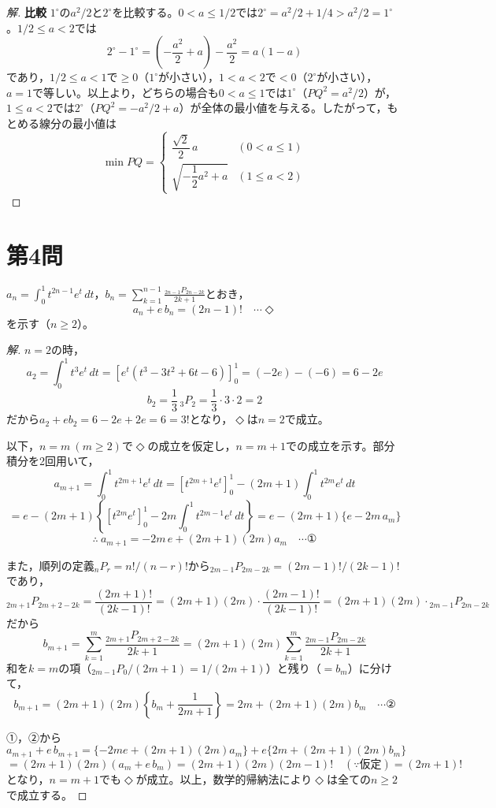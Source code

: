\documentclass[../main.tex]{subfiles}
\begin{document}
\begin{proof}[解]
  \textbf{比較} $1^\circ$の$a^2/2$と$2^\circ$を比較する。$0<a\le1/2$では$2^\circ=a^2/2+1/4>a^2/2=1^\circ$。$1/2\le a<2$では
  \[
    2^\circ-1^\circ=\left(-\frac{a^2}2+a\right)-\frac{a^2}2=a(1-a)
  \]
  であり，$1/2\le a<1$で$\ge0$（$1^\circ$が小さい），$1<a<2$で$<0$（$2^\circ$が小さい），$a=1$で等しい。以上より，どちらの場合も$0<a\le1$では$1^\circ$（$PQ^2=a^2/2$）が，$1\le a<2$では$2^\circ$（$PQ^2=-a^2/2+a$）が全体の最小値を与える。したがって，もとめる線分の最小値は
  \[
    \min PQ=
    \begin{cases}
      \dfrac{\sqrt2}2\,a & (0<a\le1)\\[2mm]
      \sqrt{-\dfrac12a^2+a} & (1\le a<2)
    \end{cases}
  \]
\end{proof}

\newpage

\section*{第4問}

$a_n=\displaystyle\int_0^1t^{2n-1}e^t\,dt$，$b_n=\displaystyle\sum_{k=1}^{n-1}\frac{{}_{2n-1}P_{2n-2k}}{2k+1}$とおき，
\[
  a_n+e\,b_n=(2n-1)! \quad\cdots\Diamond
\]
を示す（$n\ge2$）。

\begin{proof}[解]
  $n=2$の時，
  \[
    a_2=\int_0^1t^3e^t\,dt=\left[e^t(t^3-3t^2+6t-6)\right]_0^1=(-2e)-(-6)=6-2e
  \]
  \[
    b_2=\frac13\,{}_3P_2=\frac13\cdot3\cdot2=2
  \]
  だから$a_2+eb_2=6-2e+2e=6=3!$となり，$\Diamond$は$n=2$で成立。

  以下，$n=m\ (m\ge2)$で$\Diamond$の成立を仮定し，$n=m+1$での成立を示す。部分積分を2回用いて，
  \[
    a_{m+1}=\int_0^1t^{2m+1}e^t\,dt=\left[t^{2m+1}e^t\right]_0^1-(2m+1)\int_0^1t^{2m}e^t\,dt
  \]
  \[
    =e-(2m+1)\left\{\left[t^{2m}e^t\right]_0^1-2m\int_0^1t^{2m-1}e^t\,dt\right\}=e-(2m+1)\{e-2m\,a_m\}
  \]
  \[
    \therefore\ a_{m+1}=-2m\,e+(2m+1)(2m)a_m \quad\cdots\text{①}
  \]

  また，順列の定義${}_nP_r=n!/(n-r)!$から${}_{2m-1}P_{2m-2k}=(2m-1)!/(2k-1)!$であり，
  \[
    {}_{2m+1}P_{2m+2-2k}=\frac{(2m+1)!}{(2k-1)!}=(2m+1)(2m)\cdot\frac{(2m-1)!}{(2k-1)!}=(2m+1)(2m)\cdot{}_{2m-1}P_{2m-2k}
  \]
  だから
  \[
    b_{m+1}=\sum_{k=1}^m\frac{{}_{2m+1}P_{2m+2-2k}}{2k+1}=(2m+1)(2m)\sum_{k=1}^m\frac{{}_{2m-1}P_{2m-2k}}{2k+1}
  \]
  和を$k=m$の項（${}_{2m-1}P_0/(2m+1)=1/(2m+1)$）と残り（$=b_m$）に分けて，
  \[
    b_{m+1}=(2m+1)(2m)\left\{b_m+\frac1{2m+1}\right\}=2m+(2m+1)(2m)b_m \quad\cdots\text{②}
  \]

  ①，②から
  \[
    a_{m+1}+e\,b_{m+1}=\{-2me+(2m+1)(2m)a_m\}+e\{2m+(2m+1)(2m)b_m\}
  \]
  \[
    =(2m+1)(2m)(a_m+e\,b_m)=(2m+1)(2m)(2m-1)!\quad(\because\text{仮定})=(2m+1)!
  \]
  となり，$n=m+1$でも$\Diamond$が成立。以上，数学的帰納法により$\Diamond$は全ての$n\ge2$で成立する。
\end{proof}
\end{document}
